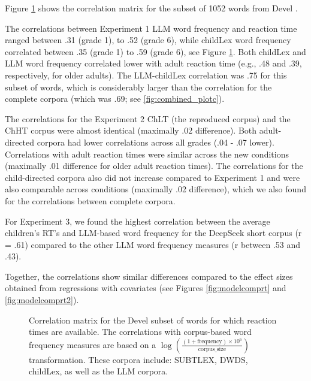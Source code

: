 \documentclass[manuscript]{stjour}
\begin{document}
Figure \ref{fig:cormat_devel} shows the correlation matrix for the subset of 1052 words from Devel \citep{schroter_developmental_2017}. 

The correlations between Experiment 1 LLM word frequency and reaction time ranged between .31 (grade 1), to .52 (grade 6), while childLex word frequency correlated between .35 (grade 1) to .59 (grade 6), see Figure \ref{fig:cormat_devel}. Both childLex and LLM word frequency correlated lower with adult reaction time (e.g., .48 and .39, respectively, for older adults). The LLM-childLex correlation was .75 for this subset of words, which is considerably larger than the correlation for the complete corpora (which was .69; see \ref{fig:combined_plotc}).

The correlations for the Experiment 2 ChLT (the reproduced corpus) and the ChHT corpus were almost identical (maximally .02 difference). Both adult-directed corpora had lower correlations across all grades (.04 - .07 lower). Correlations with adult reaction times were similar across the new conditions (maximally .01 difference for older adult reaction times). The correlations for the child-directed corpora also did not increase compared to Experiment 1 and were also comparable across conditions (maximally .02 difference), which we also found for the correlations between complete corpora. 

For Experiment 3, we found the highest correlation between the average children’s RT’s and LLM-based word frequency for the DeepSeek short corpus (r = .61) compared to the other LLM word frequency measures (r between .53 and .43). 

Together, the correlations show similar differences compared to the effect sizes obtained from regressions with covariates (see Figures \ref{fig:modelcomprt} and \ref{fig:modelcomprt2}). 

\begin{figure}[!htbp]
    \caption{Correlation matrix for the Devel subset of words for which reaction times are available. The correlations with corpus-based word frequency measures are based on a $\log\left(\frac{(1 + \text{frequency}) \times 10^6}{\text{corpus\_size}}\right)$ transformation. These corpora include: SUBTLEX, DWDS, childLex, as well as the LLM corpora.}
    \label{fig:cormat_devel}
\end{figure}
\end{document}
